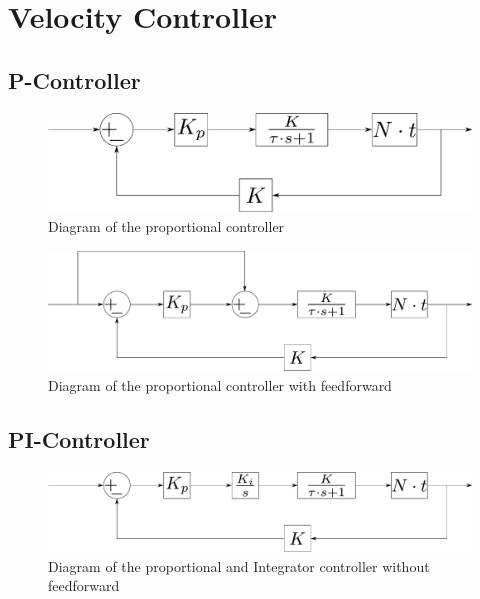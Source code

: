 \section{Velocity Controller}\label{sec:velocityController}


\subsection{P-Controller}



 \begin{figure}[H]
 	\centering
 	\includegraphics[scale=0.4]{figures/proportionalController.pdf}
 	\caption{Diagram of the proportional controller}
 	\label{proportionalController}
 \end{figure}
 
  \begin{figure}[H]
  	\centering
  	\includegraphics[scale=0.4]{figures/proportionalControllerWithFeedforward.pdf}
  	\caption{Diagram of the proportional controller with feedforward}
  	\label{proportionalControllerWithFeedforward}
  \end{figure}
 





\subsection{PI-Controller}

  \begin{figure}[H]
  	\centering
  	\includegraphics[scale=0.4]{figures/proportionalIntegratorController.pdf}
  	\caption{Diagram of the proportional and Integrator controller without feedforward}
  	\label{proportionalIntegratorController}
  \end{figure}